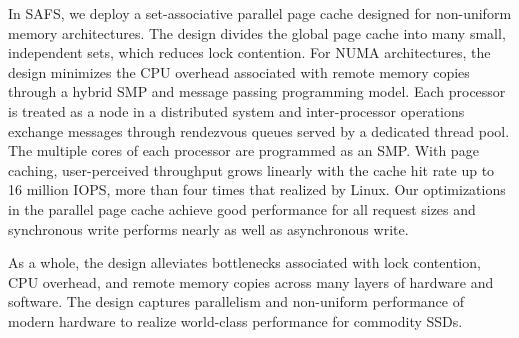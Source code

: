 In SAFS, we deploy a set-associative parallel
page cache designed for non-uniform memory architectures.  
The design divides the global page cache into many small, independent
sets, which reduces lock contention.  For NUMA architectures, the 
design minimizes the CPU overhead associated with remote memory copies 
through a hybrid SMP and message passing programming model. Each processor
is treated as a node in a distributed system and inter-processor operations
exchange messages through rendezvous queues served by a dedicated thread pool.
The multiple cores of each processor are programmed as an SMP.
With page caching, user-perceived throughput grows linearly with the 
cache hit rate up to 16 million IOPS, more than four times that realized
by Linux. Our optimizations in the parallel page cache achieve good performance
for all request sizes and synchronous write performs nearly as well as
asynchronous write.

As a whole, the design alleviates bottlenecks associated with lock contention,
CPU overhead, and remote memory copies across many layers of hardware and
software.  The design captures parallelism and non-uniform performance of
modern hardware to realize world-class performance for commodity SSDs.
